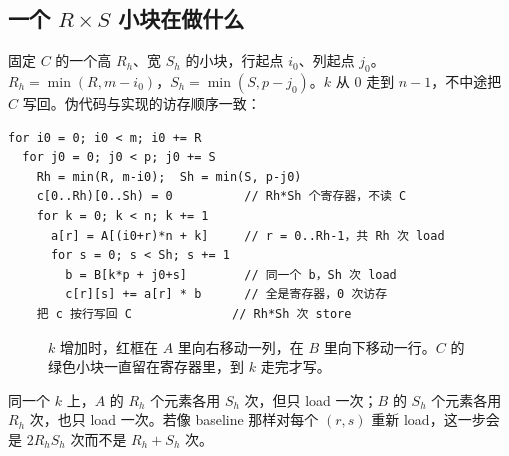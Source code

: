 \documentclass[11pt,a4paper,fontset=fandol]{ctexart}
\begin{document}
\subsection{一个 \texorpdfstring{$R\times S$}{RxS} 小块在做什么}

固定 $C$ 的一个高 $R_h$、宽 $S_h$ 的小块，行起点 $i_0$、列起点 $j_0$。$R_h=\min(R,m-i_0)$，$S_h=\min(S,p-j_0)$。$k$ 从 $0$ 走到 $n-1$，不中途把 $C$ 写回。伪代码与实现的访存顺序一致：

\begin{lstlisting}
for i0 = 0; i0 < m; i0 += R
  for j0 = 0; j0 < p; j0 += S
    Rh = min(R, m-i0);  Sh = min(S, p-j0)
    c[0..Rh)[0..Sh) = 0          // Rh*Sh 个寄存器，不读 C
    for k = 0; k < n; k += 1
      a[r] = A[(i0+r)*n + k]     // r = 0..Rh-1，共 Rh 次 load
      for s = 0; s < Sh; s += 1
        b = B[k*p + j0+s]        // 同一个 b，Sh 次 load
        c[r][s] += a[r] * b      // 全是寄存器，0 次访存
    把 c 按行写回 C              // Rh*Sh 次 store
\end{lstlisting}

\begin{figure}[ht]
\centering
{}
\caption{$k$ 增加时，红框在 $A$ 里向右移动一列，在 $B$ 里向下移动一行。$C$ 的绿色小块一直留在寄存器里，到 $k$ 走完才写。}
\label{fig:block}
\end{figure}

同一个 $k$ 上，$A$ 的 $R_h$ 个元素各用 $S_h$ 次，但只 load 一次；$B$ 的 $S_h$ 个元素各用 $R_h$ 次，也只 load 一次。若像 baseline 那样对每个 $(r,s)$ 重新 load，这一步会是 $2 R_h S_h$ 次而不是 $R_h+S_h$ 次。
\end{document}
